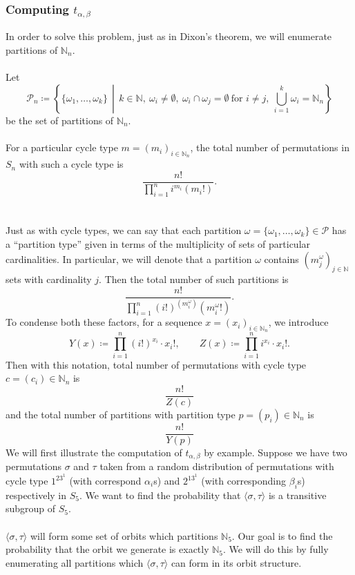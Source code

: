 \subsubsection{Computing $t_{\alpha, \beta}$}
In order to solve this problem, just as in Dixon's theorem, we will enumerate partitions of $\mathbb{N}_n$. \\\\Let
\[
\mathcal{P}_n \coloneqq \left\{ \{ \omega_1, \dots, \omega_k \} \,\middle|\, k \in \mathbb{N},\ \omega_i \neq \emptyset,\ \omega_i \cap \omega_j = \emptyset\ \text{for } i \neq j,\ \bigcup_{i=1}^k \omega_i = \mathbb{N}_n \right\}
\]be the set of partitions of \( \mathbb{N}_n \). 
\\\\For a particular cycle type $m = (m_i)_{i\in\mathbb{N}_n}$, the total number of permutations in $S_n$ with such a cycle type is 
\[
    \frac{n!}{\prod_{i=1}^ni^{m_i}(m_i!)}.
\]
\\\\Just as with cycle types, we can say that each partition $\omega = \{\omega_1,\dots, \omega_k\}\in\mathcal{P}$ has a ``partition type'' given in terms of the multiplicity of sets of particular cardinalities. In particular, we will denote that a partition $\omega$ contains $(m_j^{\omega})_{j\in\mathbb{N}}$ sets with cardinality $j$. Then the total number of such partitions is 
\[
    \frac{n!}{\prod_{i=1}^n(i!)^{(m_i^{\omega})}(m_i^{\omega}!)}.
\]
To condense both these factors, for a sequence $x = (x_i)_{i\in\mathbb{N}_n}$, we introduce
\[
Y(x) \coloneqq \prod_{i=1}^n (i!)^{x_i} \cdot x_i!, \qquad
Z(x) \coloneqq \prod_{i=1}^n i^{x_i} \cdot x_i!.
\]
Then with this notation, total number of permutations with cycle type $c = (c_i)\in\mathbb{N}_n$ is 
\[
    \frac{n!}{Z(c)}
\]
and the total number of partitions with partition type $p = (p_i)\in\mathbb{N}_n$ is 
\[
    \frac{n!}{Y(p)}
\]
We will first illustrate the computation of $t_{\alpha,\beta}$ by example. Suppose we have two permutations $\sigma$ and $\tau$ taken from a random distribution of permutations with cycle type $1^23^1$ (with correspond $\alpha_i$s)  and $2^13^1$ (with corresponding $\beta_i$s) respectively in $S_5$. We want to find the probability that $\langle \sigma, \tau \rangle$ is a transitive subgroup of $S_5$.
\\\\$\langle \sigma, \tau \rangle$ will form some set of orbits which partitions $\mathbb{N}_5$. Our goal is to find the probability that the orbit we generate is exactly $\mathbb{N}_5$. We will do this by fully enumerating all partitions which $\langle \sigma, \tau \rangle$ can form in its orbit structure.
